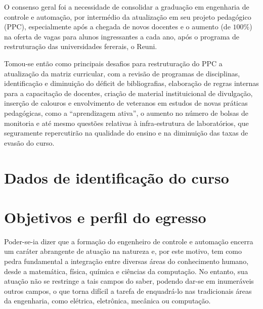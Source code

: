 O consenso geral foi a necessidade de consolidar a gradua{\c c}{\~a}o em engenharia de controle e automa{\c c}{\~a}o, por interm{\'e}dio da atualiza{\c c}{\~a}o em seu projeto pedag{\'o}gico (PPC), especialmente ap{\'o}s a chegada de novos docentes e o aumento (de $100\%$) na oferta de vagas para alunos ingressantes a cada ano, ap{\'o}s o programa de restrutura{\c c}{\~a}o das universidades fererais, o Reuni. 

Tomou-se ent{\~a}o como principais desafios para restrutura{\c c}{\~a}o do PPC a atualiza{\c c}{\~a}o da matriz curricular, com a revis{\~a}o de programas de disciplinas, identifica{\c c}{\~a}o e diminui{\c c}{\~a}o do d{\'e}ficit de bibliografias, elabora{\c c}{\~a}o de regras internas para a capacita{\c c}{\~a}o de docentes, cria{\c c}{\~a}o de material instituicional de divulga{\c c}{\~a}o, inser{\c c}{\~a}o de calouros e envolvimento de veteranos em estudos de novas pr{\'a}ticas pedag{\'o}gicas, como a ``aprendizagem ativa'', o aumento no n{\'u}mero de bolsas de monitoria e at{\'e} mesmo quest{\~o}es relativas {\`a} infra-estrutura de laborat{\'o}rios, que seguramente repercutir{\~a}o na qualidade do ensino e na diminui{\c c}{\~a}o das taxas de evas{\~a}o do curso.

\section{Dados de identificação do curso}

\section{Objetivos e perfil do egresso} \label{sec:perfildoegresso}

Poder-se-ia dizer que a forma{\c c}{\~a}o do engenheiro de controle e automa{\c c}{\~a}o encerra um car{\'a}ter abrangente de atua{\c c}{\~a}o na natureza e, por este motivo,  tem como pedra fundamental a integra{\c c}{\~a}o entre diversas {\'a}reas do conhecimento humano, desde a matem{\'a}tica, f{\'i}sica, qu{\'i}mica e ci{\^e}ncias da computa{\c c}{\~a}o. No entanto, sua atua{\c c}{\~a}o n{\~a}o se restringe a tais campos do saber, podendo dar-se em inumer{\'a}veis outros campos, o que torna dif{\'i}cil a tarefa de enquadr{\'a}-lo nas tradicionais {\'a}reas da engenharia, como el{\'e}trica, eletr{\^o}nica, mec{\^a}nica ou computa{\c c}{\~a}o.

